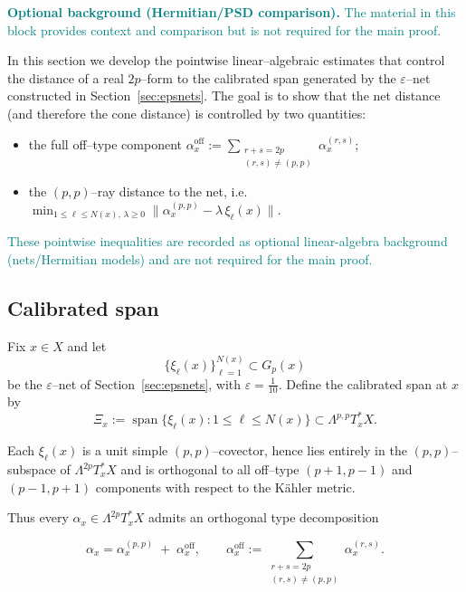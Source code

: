 \documentclass[11pt]{article}
\newcommand{\REVMZ}[1]{\textcolor{teal}{#1}}  %
\numberwithin{equation}{section}  %
\theoremstyle{plain}
\theoremstyle{definition}
\theoremstyle{remark}
\DeclareMathOperator{\Span}{span}
\begin{document}
\REVMZ{\noindent\textbf{Optional background (Hermitian/PSD comparison).}}
\REVMZ{The material in this block provides context and comparison but is not required for the main proof.}


In this section we develop the pointwise linear--algebraic estimates
that control the distance of a real $2p$--form to the calibrated
span generated by the $\varepsilon$--net constructed in Section~\ref{sec:epsnets}.
The goal is to show that the net distance (and therefore the cone
distance) is controlled by two quantities:


\begin{itemize}
\item the full off--type component $\alpha_x^{\mathrm{off}}:=\sum_{\substack{r+s=2p\\(r,s)\neq(p,p)}}\alpha_x^{(r,s)}$;
\item the $(p,p)$--ray distance to the net, i.e.\ $\min_{1\le \ell\le N(x),\,\lambda\ge 0}\|\alpha_x^{(p,p)}-\lambda\,\xi_\ell(x)\|$.
\end{itemize}



\REVMZ{These pointwise inequalities are recorded as optional linear-algebra background (nets/Hermitian models) and are not required for the main proof.}


\subsection*{Calibrated span}

Fix $x\in X$ and let 
\[
\{\xi_{\ell}(x)\}_{\ell=1}^{N(x)} \subset G_{p}(x)
\]
be the $\varepsilon$--net of Section~\ref{sec:epsnets}, with $\varepsilon=\tfrac{1}{10}$.
Define the calibrated span at $x$ by
\[
\Xi_{x}:=
\Span\{\xi_{\ell}(x):1\le \ell \le N(x)\}
\subset \Lambda^{p,p}T_{x}^{*}X.
\]

Each $\xi_{\ell}(x)$ is a unit simple $(p,p)$--covector, hence lies
entirely in the $(p,p)$--subspace of $\Lambda^{2p}T_{x}^{*}X$ and is
orthogonal to all off--type $(p+1,p-1)$ and $(p-1,p+1)$ components
with respect to the K\"ahler metric.

Thus every $\alpha_{x}\in\Lambda^{2p}T_{x}^{*}X$ admits an
orthogonal type decomposition

\begin{equation}\label{eq:typesplit-orth}
\alpha_{x}
=
\alpha_{x}^{(p,p)}
\;+\;
\alpha_{x}^{\mathrm{off}},
\qquad
\alpha_{x}^{\mathrm{off}}
:=
\sum_{\substack{r+s=2p\\(r,s)\neq(p,p)}}\alpha_{x}^{(r,s)}.
\tag{21}
\end{equation}
\end{document}
